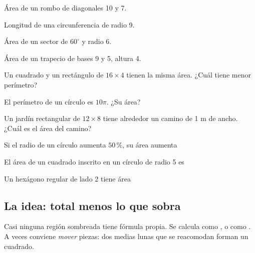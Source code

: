 \taller
{}
\begin{ejercicios}[2]
\item Área de un rombo de diagonales 10 y 7. 
\item Longitud de una circunferencia de radio 9. 
\item Área de un sector de $60^\circ$ y radio 6. 
\item Área de un trapecio de bases 9 y 5, altura 4. 
\end{ejercicios}
\begin{ejercicios}
\item Un cuadrado y un rectángulo de $16 \times 4$ tienen la misma área. ¿Cuál tiene menor perímetro? 
\item El perímetro de un círculo es $10\pi$. ¿Su área? 
\item Un jardín rectangular de $12 \times 8$ tiene alrededor un camino de 1 m de ancho. ¿Cuál es el área del camino? 
\end{ejercicios}
\begin{ejercicios}
\item Si el radio de un círculo aumenta $50\,\%$, su área aumenta
\item El área de un cuadrado inscrito en un círculo de radio 5 es
\item Un hexágono regular de lado 2 tiene área
\end{ejercicios}

\bitacora


\subsection{La idea: total menos lo que sobra}
Casi ninguna región sombreada tiene fórmula propia. Se calcula como , o como . A veces conviene \emph{mover} piezas: dos medias lunas que se
reacomodan forman un cuadrado.

